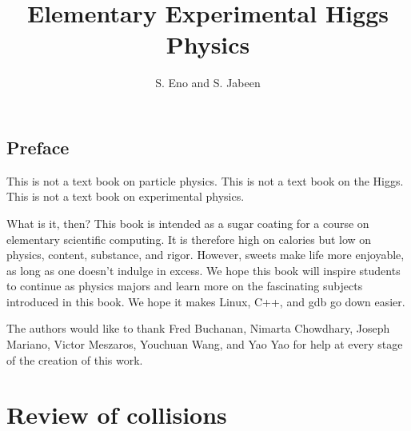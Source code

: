 \documentclass[11pt,fleqn]{book} %
\title{Elementary Experimental Higgs Physics}
\author{S. Eno and S. Jabeen}
\begin{document}
\maketitle
{}
\cftbeforetoctitleskip
\setlength{\cftbeforetoctitleskip}{1}
  \tableofcontents

\newpage
\section*{Preface}
This is not a text book on particle physics.  This is not a text book on the Higgs.  This is not a text book on experimental physics.


What is it, then?  This book is intended as a sugar coating for a course on elementary scientific computing.  It is therefore high on calories but low on
physics, content, substance, and rigor.  However, sweets make life more enjoyable, as long as one doesn't indulge in excess.  We hope this book will inspire students to continue as physics majors and learn more on the fascinating subjects introduced in this book.  We hope it makes Linux, C++, and gdb go down easier.


The authors would like to thank Fred Buchanan, Nimarta Chowdhary, Joseph Mariano, Victor Meszaros, Youchuan Wang, and Yao Yao for help at every stage of the creation of this work.




\pagestyle{fancy} %




\chapter{Review of collisions}

\end{document}
